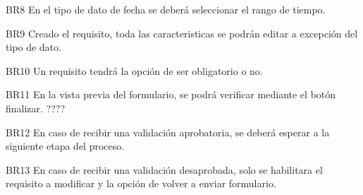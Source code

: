 \begin{BussinesRule}{BR8}{}
    \BRitem[Tipo:]
    \BRitem[Clase:]
    \BRitem[Nivel:]
    \BRitem[Descripción:]En el tipo de dato de fecha se deberá seleccionar el rango de tiempo.
    
\end{BussinesRule}
\begin{BussinesRule}{BR9}{}
    \BRitem[Tipo:]
    \BRitem[Clase:]
    \BRitem[Nivel:]
    \BRitem[Descripción:]Creado el requisito, toda las caracteristicas  se podrán editar a excepción del tipo de dato.
    
\end{BussinesRule}
\begin{BussinesRule}{BR10}{}
    \BRitem[Tipo:]
    \BRitem[Clase:]
    \BRitem[Nivel:]
    \BRitem[Descripción:]Un requisito tendrá la opción de ser obligatorio o no.
    
\end{BussinesRule}
\begin{BussinesRule}{BR11}{}
    \BRitem[Tipo:]
    \BRitem[Clase:]
    \BRitem[Nivel:]
    \BRitem[Descripción:]En la vista previa del formulario,  se podrá verificar mediante el botón finalizar. ????
    
\end{BussinesRule}
\begin{BussinesRule}{BR12}{}
    \BRitem[Tipo:]
    \BRitem[Clase:]
    \BRitem[Nivel:]
    \BRitem[Descripción:]En caso de recibir una validación aprobatoria, se deberá esperar a la siguiente etapa del proceso.
    
\end{BussinesRule}
\begin{BussinesRule}{BR13}{}
    \BRitem[Tipo:]
    \BRitem[Clase:]
    \BRitem[Nivel:]
    \BRitem[Descripción:]En caso de recibir una validación desaprobada, solo se habilitara el requisito a modificar y la opción de volver a enviar formulario.
    
\end{BussinesRule}

